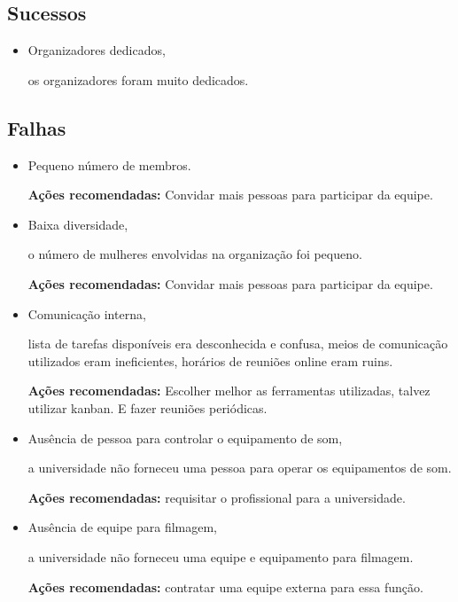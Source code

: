 \documentclass[12pt]{article}
\begin{document}
\subsection*{Sucessos}

\begin{itemize}
  \item Organizadores dedicados,

    os organizadores foram muito dedicados.
\end{itemize}

\subsection*{Falhas}

\begin{itemize}
  \item Pequeno número de membros.

    \textbf{Ações recomendadas:} Convidar mais pessoas para participar da
    equipe.

  \item Baixa diversidade,

    o número de mulheres envolvidas na organização foi pequeno.

    \textbf{Ações recomendadas:} Convidar mais pessoas para participar da
    equipe.

  \item Comunicação interna,

    lista de tarefas disponíveis era desconhecida e confusa, meios de
    comunicação utilizados eram ineficientes, horários de reuniões online eram
    ruins.

    \textbf{Ações recomendadas:} Escolher melhor as ferramentas utilizadas,
    talvez utilizar kanban.
    E fazer reuniões periódicas.

  \item Ausência de pessoa para controlar o equipamento de som,

    a universidade não forneceu uma pessoa para operar os equipamentos de som.

    \textbf{Ações recomendadas:} requisitar o profissional para a universidade.

  \item Ausência de equipe para filmagem,

    a universidade não forneceu uma equipe e equipamento para filmagem.

    \textbf{Ações recomendadas:} contratar uma equipe externa para essa função.


\end{itemize}
\end{document}
